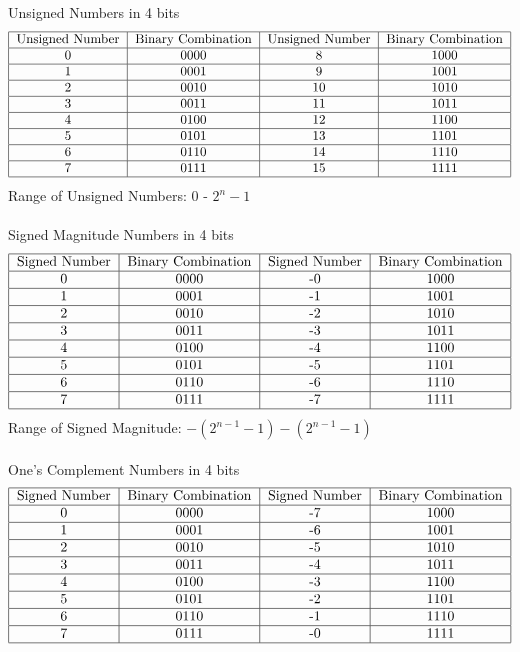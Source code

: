 \documentclass[12pt]{article}
\begin{document}
Unsigned Numbers in 4 bits $$ \begin{tabular}{|c|c|c|c|} \hline 
Unsigned Number & Binary Combination & Unsigned Number & Binary Combination \\ \hline 
0 & 0000 & 8 & 1000 \\ \hline
1 & 0001 & 9 & 1001 \\ \hline 
2 & 0010 & 10 & 1010 \\ \hline 
3 & 0011 & 11 & 1011 \\ \hline
4 & 0100 & 12 & 1100 \\ \hline
5 & 0101 & 13 & 1101 \\ \hline
6 & 0110 & 14 & 1110 \\ \hline 
7 & 0111 & 15 & 1111 \\ \hline \end{tabular} $$ 
Range of Unsigned Numbers: 0 - $2^n - 1$ \\~\\
Signed Magnitude Numbers in 4 bits $$ \begin{tabular}{|c|c|c|c|} \hline 
Signed Number & Binary Combination & Signed Number & Binary Combination \\ \hline 
0 & 0000 & -0 & 1000 \\ \hline 
1 & 0001 & -1 & 1001 \\ \hline 
2 & 0010 & -2 & 1010 \\ \hline 
3 & 0011 & -3 & 1011 \\ \hline
4 & 0100 & -4 & 1100 \\ \hline
5 & 0101 & -5 & 1101 \\ \hline
6 & 0110 & -6 & 1110 \\ \hline 
7 & 0111 & -7 & 1111 \\ \hline \end{tabular} $$ 
Range of Signed Magnitude: $-(2^{n - 1} - 1) - (2^{n - 1} - 1)$ \\~\\
One's Complement Numbers in 4 bits $$ \begin{tabular}{|c|c|c|c|} \hline 
Signed Number & Binary Combination & Signed Number & Binary Combination  \\ \hline 
0 & 0000 & -7 & 1000 \\ \hline 
1 & 0001 & -6 & 1001 \\ \hline 
2 & 0010 & -5 & 1010 \\ \hline 
3 & 0011 & -4 & 1011 \\ \hline
4 & 0100 & -3 & 1100 \\ \hline
5 & 0101 & -2 & 1101 \\ \hline
6 & 0110 & -1 & 1110 \\ \hline 
7 & 0111 & -0 & 1111 \\ \hline \end{tabular} $$ 
\end{document}
